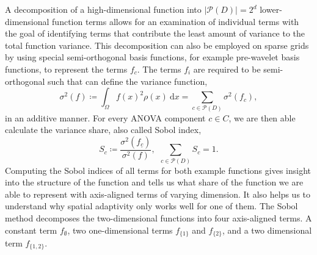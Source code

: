 \documentclass[
  a4paper,  %
  twoside,  %
  bibliography=totoc,
  headsepline,
  cleardoublepage=empty,
  parskip=half,
  draft=false
]{scrbook}
\begin{document}
A decomposition of a high-dimensional function into $|\mathcal{P}(D)|=2^d$ lower-dimensional function terms allows for an examination of individual terms with the goal of identifying terms that contribute the least amount of variance to the total function variance.
This decomposition can also be employed on sparse grids \cite{Feuersaenger2010} by using special semi-orthogonal basis functions, for example pre-wavelet basis functions, to represent the terms $f_c$.
The terms $f_i$ are required to be semi-orthogonal such that can define the variance function,
\begin{equation}
\sigma^2(f) \coloneqq \int_{\Omega} f(x)^2 \rho(x) ~ \text{d} x=\sum_{c \in \mathcal{P}(D)} \sigma^2(f_c),
\end{equation}
in an additive manner.
For every ANOVA component $c \in C$, we are then able calculate the variance share, also called Sobol index,
\begin{equation}
S_{c} \coloneqq \frac{\sigma^2(f_{\underline{c}} )}{\sigma^2(f)}, ~~ \sum_{c \in \mathcal{P}(D)} S_{c} = 1.
\end{equation}
Computing the Sobol indices of all terms for both example functions gives insight into the structure of the function and tells us what share of the function we are able to represent with axis-aligned terms of varying dimension.
It also helps us to understand why spatial adaptivity only works well for one of them.
The Sobol method decomposes the two-dimensional functions into four axis-aligned terms.
A constant term $f_\emptyset$, two one-dimensional terms $f_{\{1\}}$ and $f_{\{2\}}$, and a two dimensional term $f_{\{1,2\}}$.
\end{document}
